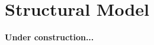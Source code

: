 \documentclass[9pt,aspectratio=169]{beamer}
\begin{document}




\section{Structural Model}

\begin{frame}
      \begin{center}
            \textbf{Under construction...}
      \end{center}
\end{frame}

\end{document}
